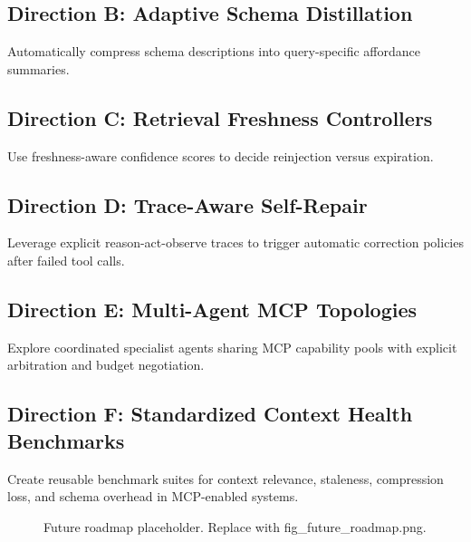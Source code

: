 \documentclass[conference]{IEEEtran}
\begin{document}
\subsection{Direction B: Adaptive Schema Distillation}

Automatically compress schema descriptions into query-specific affordance summaries.

\subsection{Direction C: Retrieval Freshness Controllers}

Use freshness-aware confidence scores to decide reinjection versus expiration.

\subsection{Direction D: Trace-Aware Self-Repair}

Leverage explicit reason-act-observe traces to trigger automatic correction policies after failed tool calls.

\subsection{Direction E: Multi-Agent MCP Topologies}

Explore coordinated specialist agents sharing MCP capability pools with explicit arbitration and budget negotiation.

\subsection{Direction F: Standardized Context Health Benchmarks}

Create reusable benchmark suites for context relevance,
staleness,
compression loss,
and schema overhead in MCP-enabled systems.

\begin{figure}[H]
\centering
{}
\caption{Future roadmap placeholder. Replace with fig\_future\_roadmap.png.}
\label{fig:future_roadmap}
\end{figure}
\end{document}
